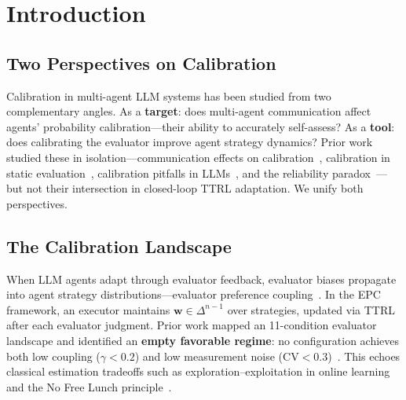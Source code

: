 \documentclass[11pt]{article}
\newcommand{\CV}{\ensuremath{\mathrm{CV}}}
\theoremstyle{definition}
\theoremstyle{remark}
\begin{document}
\begin{abstract}
factorial experiment ($N{=}120$ seeds, $T{=}30$, Qwen3-14B-AWQ) reveals no overall effect of Communication or Calibration at convergence (all $p > 0.12$, seed-level tests). A suggestive late-phase Communication pattern ($\gamma$ $d{=}-0.245$, $p{=}0.182$; $H$ $d{=}+0.309$, $p{=}0.093$) does not reach significance at the seed level, and a preregistered $T{=}50$ horizon extension ($N{=}120$ further seeds) failed its strengthening criterion ($d > 0.30$ in Rounds 46--50; observed $\gamma$ $d{=}-0.17$, $p{=}0.36$; all windows null), although the sign of every window effect replicates across horizons. We report the delayed-communication hypothesis as unconfirmed rather than established. Calibration effects are nonsignificant at every tested phase and horizon; the tests do not establish equivalence.
\end{abstract}

\newpage

\section{Introduction}

\subsection{Two Perspectives on Calibration}

Calibration in multi-agent LLM systems has been studied from two complementary angles. As a \textbf{target}: does multi-agent communication affect agents' probability calibration---their ability to accurately self-assess? As a \textbf{tool}: does calibrating the evaluator improve agent strategy dynamics? Prior work studied these in isolation---communication effects on calibration~\citep{huang2026cagecal}, calibration in static evaluation~\citep{guo2017calibration}, calibration pitfalls in LLMs~\citep{tian2023calibration}, and the reliability paradox~\citep{messing2026tee}---but not their intersection in closed-loop TTRL adaptation. We unify both perspectives.

\subsection{The Calibration Landscape}

When LLM agents adapt through evaluator feedback, evaluator biases propagate into agent strategy distributions---evaluator preference coupling~\citep{epc2026}. In the EPC framework, an executor maintains $\mathbf{w} \in \Delta^{n-1}$ over strategies, updated via TTRL after each evaluator judgment. Prior work mapped an 11-condition evaluator landscape and identified an \textbf{empty favorable regime}: no configuration achieves both low coupling ($\gamma < 0.2$) and low measurement noise ($\CV < 0.3$)~\citep{caleffects2026}. This echoes classical estimation tradeoffs such as exploration--exploitation in online learning~\citep{bubeck2012regret} and the No Free Lunch principle~\citep{wolpert1997no}.
\end{document}
